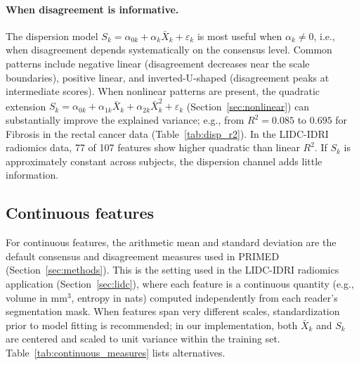 \documentclass[referee,lineno,pdflatex,sn-vancouver-num]{sn-jnl}
\begin{document}
\begin{appendices}
\paragraph{When disagreement is informative.}
The dispersion model $S_k = \alpha_{0k} + \alpha_k \bar X_k + \varepsilon_k$ is most useful when $\alpha_k \neq 0$, i.e., when disagreement depends systematically on the consensus level.
Common patterns include negative linear (disagreement decreases near the scale boundaries), positive linear, and inverted-U-shaped (disagreement peaks at intermediate scores).
When nonlinear patterns are present, the quadratic extension $S_k = \alpha_{0k} + \alpha_{1k} \bar X_k + \alpha_{2k} \bar X_k^2 + \varepsilon_k$ (Section~\ref{sec:nonlinear}) can substantially improve the explained variance; e.g., from $R^2 = 0.085$ to $0.695$ for Fibrosis in the rectal cancer data (Table~\ref{tab:disp_r2}).
In the LIDC-IDRI radiomics data, 77 of 107 features show higher quadratic than linear $R^2$.
If $S_k$ is approximately constant across subjects, the dispersion channel adds little information.

\subsection{Continuous features}\label{secA2}

For continuous features, the arithmetic mean and standard deviation are the default consensus and disagreement measures used in PRIMED (Section~\ref{sec:methods}).
This is the setting used in the LIDC-IDRI radiomics application (Section~\ref{sec:lidc}), where each feature is a continuous quantity (e.g., volume in mm$^3$, entropy in nats) computed independently from each reader's segmentation mask.
When features span very different scales, standardization prior to model fitting is recommended; in our implementation, both $\bar X_k$ and $S_k$ are centered and scaled to unit variance within the training set.
Table~\ref{tab:continuous_measures} lists alternatives.


\end{appendices}
\end{document}
